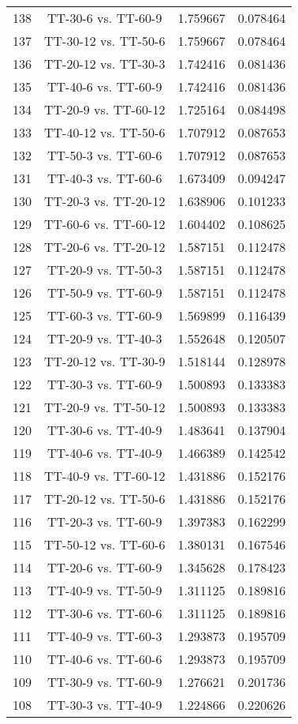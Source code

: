 \documentclass[a4paper,10pt]{article}
\begin{document}
\begin{landscape}
\begin{table}[!htp]
\begin{tabular}{cccc}
138&TT-30-6 vs. TT-60-9&1.759667&0.078464\\
137&TT-30-12 vs. TT-50-6&1.759667&0.078464\\
136&TT-20-12 vs. TT-30-3&1.742416&0.081436\\
135&TT-40-6 vs. TT-60-9&1.742416&0.081436\\
134&TT-20-9 vs. TT-60-12&1.725164&0.084498\\
133&TT-40-12 vs. TT-50-6&1.707912&0.087653\\
132&TT-50-3 vs. TT-60-6&1.707912&0.087653\\
131&TT-40-3 vs. TT-60-6&1.673409&0.094247\\
130&TT-20-3 vs. TT-20-12&1.638906&0.101233\\
129&TT-60-6 vs. TT-60-12&1.604402&0.108625\\
128&TT-20-6 vs. TT-20-12&1.587151&0.112478\\
127&TT-20-9 vs. TT-50-3&1.587151&0.112478\\
126&TT-50-9 vs. TT-60-9&1.587151&0.112478\\
125&TT-60-3 vs. TT-60-9&1.569899&0.116439\\
124&TT-20-9 vs. TT-40-3&1.552648&0.120507\\
123&TT-20-12 vs. TT-30-9&1.518144&0.128978\\
122&TT-30-3 vs. TT-60-9&1.500893&0.133383\\
121&TT-20-9 vs. TT-50-12&1.500893&0.133383\\
120&TT-30-6 vs. TT-40-9&1.483641&0.137904\\
119&TT-40-6 vs. TT-40-9&1.466389&0.142542\\
118&TT-40-9 vs. TT-60-12&1.431886&0.152176\\
117&TT-20-12 vs. TT-50-6&1.431886&0.152176\\
116&TT-20-3 vs. TT-60-9&1.397383&0.162299\\
115&TT-50-12 vs. TT-60-6&1.380131&0.167546\\
114&TT-20-6 vs. TT-60-9&1.345628&0.178423\\
113&TT-40-9 vs. TT-50-9&1.311125&0.189816\\
112&TT-30-6 vs. TT-60-6&1.311125&0.189816\\
111&TT-40-9 vs. TT-60-3&1.293873&0.195709\\
110&TT-40-6 vs. TT-60-6&1.293873&0.195709\\
109&TT-30-9 vs. TT-60-9&1.276621&0.201736\\
108&TT-30-3 vs. TT-40-9&1.224866&0.220626\\

\end{tabular}
\end{table}
\end{landscape}
\end{document}
